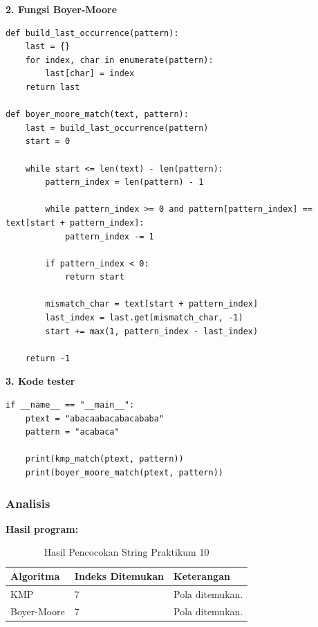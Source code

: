 \textbf{2. Fungsi Boyer-Moore}
\begin{lstlisting}[basicstyle=\ttfamily\scriptsize, frame=single, backgroundcolor=\color{white}, numbers=none, keywordstyle=\color{black}, commentstyle=\color{black}, stringstyle=\color{black}, breaklines=true]
def build_last_occurrence(pattern):
    last = {}
    for index, char in enumerate(pattern):
        last[char] = index
    return last

def boyer_moore_match(text, pattern):
    last = build_last_occurrence(pattern)
    start = 0

    while start <= len(text) - len(pattern):
        pattern_index = len(pattern) - 1

        while pattern_index >= 0 and pattern[pattern_index] == text[start + pattern_index]:
            pattern_index -= 1

        if pattern_index < 0:
            return start

        mismatch_char = text[start + pattern_index]
        last_index = last.get(mismatch_char, -1)
        start += max(1, pattern_index - last_index)

    return -1
\end{lstlisting}

\textbf{3. Kode tester}
\begin{lstlisting}[basicstyle=\ttfamily\scriptsize, frame=single, backgroundcolor=\color{white}, numbers=none, keywordstyle=\color{black}, commentstyle=\color{black}, stringstyle=\color{black}, breaklines=true]
if __name__ == "__main__":
    ptext = "abacaabacabacababa"
    pattern = "acabaca"

    print(kmp_match(ptext, pattern))
    print(boyer_moore_match(ptext, pattern))
\end{lstlisting}

\subsubsection*{Analisis}
\textbf{Hasil program:}
\begin{table}[H]
    \centering
    \caption{Hasil Pencocokan String Praktikum 10}
    \label{tab:praktikum10-hasil}
    \begin{tabular}{lll}
    \toprule
    \textbf{Algoritma} & \textbf{Indeks Ditemukan} & \textbf{Keterangan} \\ \midrule
    KMP & 7 & Pola ditemukan. \\
    Boyer-Moore & 7 & Pola ditemukan. \\ \bottomrule
    \end{tabular}
\end{table}

